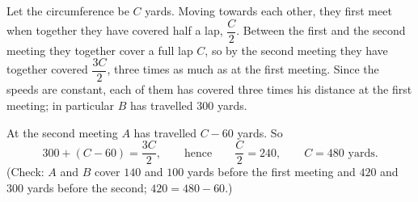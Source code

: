 Let the circumference be $C$ yards. Moving towards each other, they first meet when together they have covered half a lap, $\dfrac {C}{2}$. Between the first and the second meeting they together cover a full lap $C$, so by the second meeting they have together covered $\dfrac{3C}{2}$, three times as much as at the first meeting. Since the speeds are constant, each of them has covered three times his distance at the first meeting; in particular $B$ has travelled $300$ yards.

At the second meeting $A$ has travelled $C-60$ yards. So
\[300+(C-60)=\dfrac{3C}{2},\qquad\text{hence}\qquad \dfrac {C}{2}=240,\qquad C=\boxed{480}\text{ yards}.\]
(Check: $A$ and $B$ cover $140$ and $100$ yards before the first meeting and $420$ and $300$ yards before the second; $420=480-60$.)
